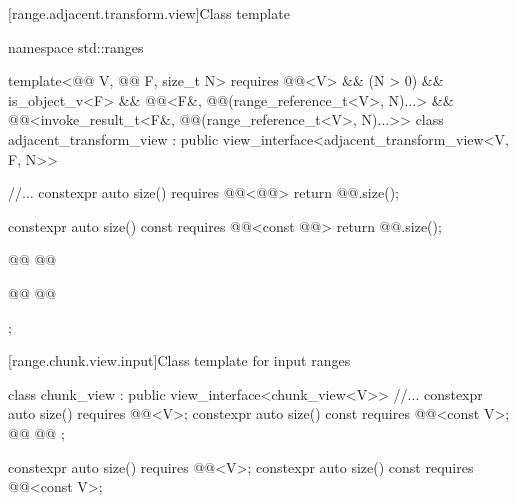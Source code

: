 \documentclass{wg21}
\begin{document}
[range.adjacent.transform.view]{Class template }

%
%
%
\begin{codeblock}
namespace std::ranges {
template<@@ V, @@ F, size_t N>
requires @@<V> && (N > 0) && is_object_v<F> &&
@@<F&, @@(range_reference_t<V>, N)...> &&
@@<invoke_result_t<F&, @@(range_reference_t<V>, N)...>>
class adjacent_transform_view : public view_interface<adjacent_transform_view<V, F, N>> {
    //...
    constexpr auto size() requires @@<@@> {
        return @@.size();
    }

    constexpr auto size() const requires @@<const @@> {
        return @@.size();
    }

    @@
    @@

    @@
    @@
};
}
\end{codeblock}

[range.chunk.view.input]{Class template  for input ranges}

%
%
%
\begin{codeblock}
class chunk_view : public view_interface<chunk_view<V>> {
    //...
    constexpr auto size() requires @@<V>;
    constexpr auto size() const requires @@<const V>;
    @@
    @@
};
\end{codeblock}

\begin{itemdecl}
    constexpr auto size() requires @@<V>;
    constexpr auto size() const requires @@<const V>;
\end{itemdecl}
\end{document}
